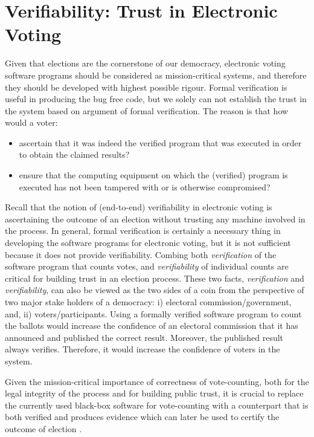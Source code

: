 	
	  
	 
		
 \section{Verifiability: Trust in Electronic Voting}
 \label{secback:varifiability}
 Given that elections are  the cornerstone of our democracy, 
   electronic voting software programs should be considered as mission-critical systems, 
   and therefore they should be developed with highest possible rigour. 
  Formal verification is useful in producing the 
   bug free code, but we solely can not 
   establish the trust in the system based on argument of 
   formal verification. The reason is that how would a voter:
   \begin{itemize}
   \item ascertain that it was indeed the verified program that was
	executed in order to obtain the claimed results?
	
   \item ensure that the computing equipment on which the (verified)
	program is executed has not been tampered with or is otherwise
	compromised?
	
   \end{itemize}
   
   \noindent
   
    Recall that the notion of (end-to-end) verifiability in electronic voting is
 ascertaining the outcome of an election without trusting any 
 machine involved in the process. 
   In general, formal verification is certainly a necessary thing 
   in developing the software programs for electronic voting, 
   but it is not sufficient because it does not provide verifiability.
   Combing both \emph{verification} of the
	software program that counts votes, and
	\emph{verifiability} of individual counts are critical for
	building trust in an election process. These two facts, 
	 \emph{verification}  and \emph{verifiability}, 
	 can also be viewed as the
    two sides of a coin from the perspective of two major stake holders of 
    a democracy: i) electoral commission/government, and, ii) voters/participants.  
    Using a formally 
    verified software program to count the ballots would increase the confidence 
    of an electoral commission that it has announced and published the correct result. 
    Moreover,  the published result always verifies.  Therefore,  it would increase the confidence
    of voters in the system. 
	 
	 
	Given the mission-critical importance of
	 correctness of vote-counting,
	both for the legal integrity of the process and for
	building public trust,  it is crucial to replace the
	currently used black-box software for vote-counting with a
	counterpart that is both verified and produces 
	evidence which can later be used to certify
	the outcome of election \citep{Bernhard:2017:PES} \citep{Rivest:2008:PTRS}.
	  		
